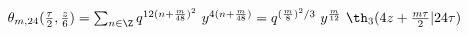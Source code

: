 \begin{equation}  
\begin{array}{l}
  \theta_{m,24} ({\tau\over 2}, {z\over 6}) = \sum_{n\in\Z}
  q^{12(n+{m\over 48})^2} ~y^{4(n+{m\over 48})} = q^{({m\over 8})^2 /3}
  ~y^{m\over 12} ~\th_3(4z+{m\tau\over 2} |24\tau)
  \end{array}
\end{equation}

